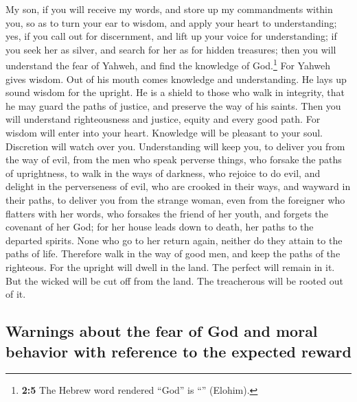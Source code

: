  My son, if you will receive my words, and store up my
commandments within you,  so as to turn your ear to
wisdom, and apply your heart to understanding;  yes, if
you call out for discernment, and lift up your voice for understanding;
 if you seek her as silver, and search for her as for
hidden treasures;  then you will understand the fear of
Yahweh, and find the knowledge of God.\footnote{\textbf{2:5} The Hebrew
  word rendered ``God'' is ``'' (Elohim).} 
For Yahweh gives wisdom. Out of his mouth comes knowledge and
understanding.  He lays up sound wisdom for the upright.
He is a shield to those who walk in integrity,  that he
may guard the paths of justice, and preserve the way of his saints.
 Then you will understand righteousness and justice,
equity and every good path.  For wisdom will enter into
your heart. Knowledge will be pleasant to your soul. 
Discretion will watch over you. Understanding will keep you,
 to deliver you from the way of evil, from the men who
speak perverse things,  who forsake the paths of
uprightness, to walk in the ways of darkness,  who
rejoice to do evil, and delight in the perverseness of evil,
 who are crooked in their ways, and wayward in their
paths,  to deliver you from the strange woman, even from
the foreigner who flatters with her words,  who forsakes
the friend of her youth, and forgets the covenant of her God;
 for her house leads down to death, her paths to the
departed spirits.  None who go to her return again,
neither do they attain to the paths of life.  Therefore
walk in the way of good men, and keep the paths of the righteous.
 For the upright will dwell in the land. The perfect will
remain in it.  But the wicked will be cut off from the
land. The treacherous will be rooted out of it.

\hypertarget{warnings-about-the-fear-of-god-and-moral-behavior-with-reference-to-the-expected-reward}{%
\subsection{Warnings about the fear of God and moral behavior with
reference to the expected
reward}\label{warnings-about-the-fear-of-god-and-moral-behavior-with-reference-to-the-expected-reward}}

